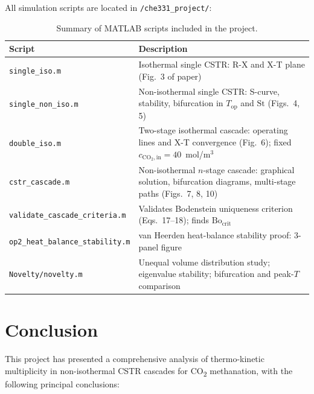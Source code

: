\documentclass[11pt,a4paper]{article}
\newcommand{\Top}{T_{\mathrm{op}}}
\newcommand{\St}{\mathrm{St}}
\newcommand{\Bo}{\mathrm{Bo}}
\newcommand{\cin}{c_{\mathrm{CO_2,in}}}
\begin{document}
All simulation scripts are located in \texttt{/che331\_project/}:

\begin{table}[h!]
\centering
\caption{Summary of MATLAB scripts included in the project.}
\renewcommand{\arraystretch}{1.15}
\begin{tabular}{@{}p{6.2cm}p{9.8cm}@{}}
\toprule
Script & Description \\
\midrule
\texttt{single\_iso.m} & Isothermal single CSTR: R-X and X-T plane (Fig.~3 of paper) \\
\texttt{single\_non\_iso.m} & Non-isothermal single CSTR: S-curve, stability, bifurcation in $\Top$ and $\St$ (Figs.~4, 5) \\
\texttt{double\_iso.m} & Two-stage isothermal cascade: operating lines and X-T convergence (Fig.~6); fixed $\cin=40$~mol/m$^3$ \\
\texttt{cstr\_cascade.m} & Non-isothermal $n$-stage cascade: graphical solution, bifurcation diagrams, multi-stage paths (Figs.~7, 8, 10) \\
\texttt{validate\_cascade\_criteria.m} & Validates Bodenstein uniqueness criterion (Eqs.~17--18); finds $\Bo_\mathrm{crit}$ \\
\texttt{op2\_heat\_balance\_stability.m} & van Heerden heat-balance stability proof: 3-panel figure \\
\texttt{Novelty/novelty.m} & Unequal volume distribution study; eigenvalue stability; bifurcation and peak-$T$ comparison \\
\bottomrule
\end{tabular}
\end{table}

\section{Conclusion}
\label{sec:conclusion}

This project has presented a comprehensive analysis of thermo-kinetic
multiplicity in non-isothermal CSTR cascades for CO\textsubscript{2}
methanation, with the following principal conclusions:
\end{document}
